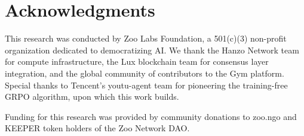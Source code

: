 \section*{Acknowledgments}


This research was conducted by Zoo Labs Foundation, a 501(c)(3) non-profit organization dedicated to democratizing AI. We thank the Hanzo Network team for compute infrastructure, the Lux blockchain team for consensus layer integration, and the global community of contributors to the Gym platform. Special thanks to Tencent's youtu-agent team for pioneering the training-free GRPO algorithm, upon which this work builds.

Funding for this research was provided by community donations to zoo.ngo and KEEPER token holders of the Zoo Network DAO.


